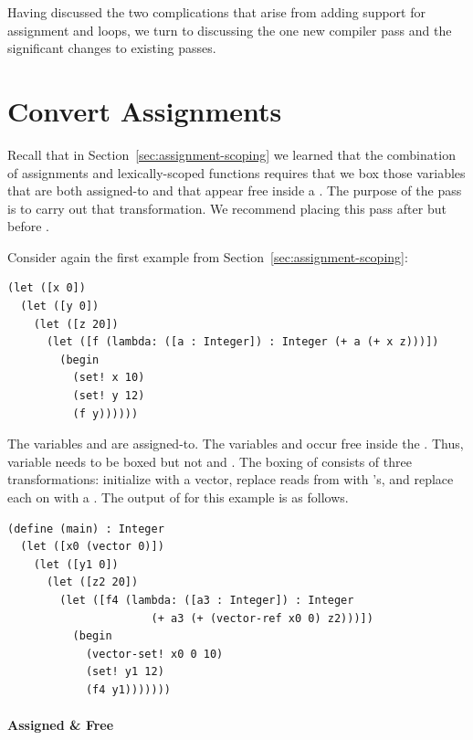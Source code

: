 \documentclass[11pt]{book}
\newcommand{\ocaml}[1]{{\color{blue}{#1}}}
\begin{document}
Having discussed the two complications that arise from adding support
for assignment and loops, we turn to discussing the one new compiler
pass and the significant changes to existing passes.

\section{Convert Assignments}
\label{sec:convert-assignments}

\ocaml{OCaml version: We do not need this pass, because we have no lexically-scoped functions.}
Recall that in Section~\ref{sec:assignment-scoping} we learned that
the combination of assignments and lexically-scoped functions requires
that we box those variables that are both assigned-to and that appear
free inside a . The purpose of the
 pass is to carry out that transformation.
We recommend placing this pass after  but before
.

Consider again the first example from
Section~\ref{sec:assignment-scoping}:
\begin{lstlisting}
(let ([x 0])
  (let ([y 0])
    (let ([z 20])
      (let ([f (lambda: ([a : Integer]) : Integer (+ a (+ x z)))])
        (begin
          (set! x 10)
          (set! y 12)
          (f y))))))
\end{lstlisting}
The variables  and  are assigned-to.  The variables
 and  occur free inside the . Thus,
variable  needs to be boxed but not  and .
The boxing of  consists of three transformations: initialize
 with a vector, replace reads from  with
's, and replace each  on  with a
. The output of  for this
example is as follows.
\begin{lstlisting}
(define (main) : Integer
  (let ([x0 (vector 0)])
    (let ([y1 0])
      (let ([z2 20])
        (let ([f4 (lambda: ([a3 : Integer]) : Integer
                      (+ a3 (+ (vector-ref x0 0) z2)))])
          (begin 
            (vector-set! x0 0 10)
            (set! y1 12)
            (f4 y1)))))))
\end{lstlisting}

\paragraph{Assigned \& Free}
\end{document}
